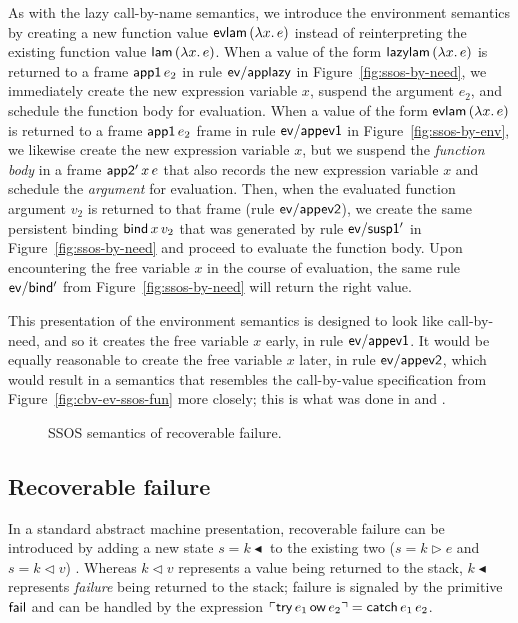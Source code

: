 As with the lazy call-by-name semantics, we introduce the environment
semantics by creating a new function value ${\sf evlam}\,(\lambda
x.\,e)$ instead of reinterpreting the existing function value ${\sf
  lam}\,(\lambda x.\,e)$. When a value of the form ${\sf
  lazylam}\,(\lambda x.\,e)$ is returned to a frame ${\sf app1}\,e_2$
in rule ${\sf ev/applazy}$ in Figure~\ref{fig:ssos-by-need}, we
immediately create the new expression variable $x$, suspend the
argument $e_2$, and schedule the function body for evaluation. When a
value of the form ${\sf evlam}\,(\lambda x.\,e)$ is returned to a
frame ${\sf app1}\,e_2$ frame in rule ${\sf ev/appev1}$ in
Figure~\ref{fig:ssos-by-env}, we likewise create the new expression
variable $x$, but we suspend the {\it function body} in a frame ${\sf
  app2'}\,x\,e$ that also records the new expression variable $x$ and
schedule the {\it argument} for evaluation. Then, when the evaluated
function argument $v_2$ is returned to that frame (rule ${\sf
  ev/appev2}$), we create the same persistent binding ${\sf
  bind}\,x\,v_2$ that was generated by rule ${\sf ev/susp1'}$ in
Figure~\ref{fig:ssos-by-need} and proceed to evaluate the function
body. Upon encountering the free variable $x$ in the course of
evaluation, the same rule ${\sf ev/bind'}$ from
Figure~\ref{fig:ssos-by-need} will return the right value.

This presentation of the environment semantics is designed to look
like call-by-need, and so it creates the free variable $x$ early, in
rule ${\sf ev/appev1}$.  It would be equally reasonable to create the
free variable $x$ later, in rule ${\sf ev/appev2}$, which would result
in a semantics that resembles the call-by-value specification from
Figure~\ref{fig:cbv-ev-ssos-fun} more closely; this is what
was done in \cite{pfenning09substructural} and
\cite{simmons11logical}.


\begin{figure}
\caption{SSOS semantics of recoverable failure.}
\label{fig:ssos-fail}
\end{figure}


\subsection{Recoverable failure}
\label{sec:failure}

In a standard abstract machine presentation, recoverable failure can 
be introduced by adding a new state $s = k {\blacktriangleleft}$
to the existing two ($s = k \rhd e$ and $s = k \lhd v$)
\cite[Chapter 28]{harper12practical}. Whereas $k
\lhd v$ represents a value being returned to the stack, $k
{\blacktriangleleft}$ represents {\it failure} being returned to the
stack; failure is signaled by the primitive ${\sf fail}$ and
can be handled by the expression ${\ulcorner{{\sf try}\,e_1\,{\sf ow}\,e_2}\urcorner} = 
{\sf catch}\,e_1\,e_2$. 


